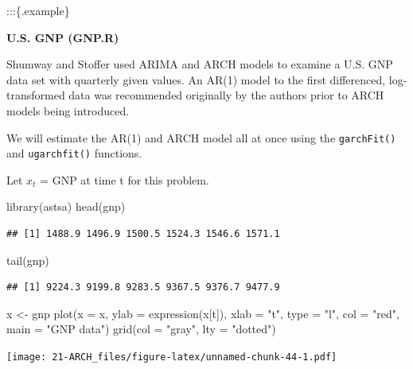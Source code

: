 \documentclass[
]{book}
\newenvironment{Shaded}{\begin{snugshade}}{\end{snugshade}}
\newcommand{\AttributeTok}[1]{\textcolor[rgb]{0.77,0.63,0.00}{#1}}
\newcommand{\FunctionTok}[1]{\textcolor[rgb]{0.00,0.00,0.00}{#1}}
\newcommand{\NormalTok}[1]{#1}
\newcommand{\OtherTok}[1]{\textcolor[rgb]{0.56,0.35,0.01}{#1}}
\newcommand{\StringTok}[1]{\textcolor[rgb]{0.31,0.60,0.02}{#1}}
\theoremstyle{definition}
\theoremstyle{definition}
\theoremstyle{definition}
\theoremstyle{definition}
\theoremstyle{remark}
\begin{document}
:::\{.example\}

\textbf{U.S. GNP (GNP.R)}

Shumway and Stoffer used ARIMA and ARCH models to examine a U.S. GNP data set with quarterly given values. An AR(1) model to the first differenced, log-transformed data was recommended originally by the authors prior to ARCH models being introduced.

We will estimate the AR(1) and ARCH model all at once using the \texttt{garchFit()} and \texttt{ugarchfit()} functions.

Let \(x_t\) = GNP at time t for this problem.

\begin{Shaded}
\begin{Highlighting}[]
\FunctionTok{library}\NormalTok{(astsa)}
\FunctionTok{head}\NormalTok{(gnp)}
\end{Highlighting}
\end{Shaded}

\begin{verbatim}
## [1] 1488.9 1496.9 1500.5 1524.3 1546.6 1571.1
\end{verbatim}

\begin{Shaded}
\begin{Highlighting}[]
\FunctionTok{tail}\NormalTok{(gnp)}
\end{Highlighting}
\end{Shaded}

\begin{verbatim}
## [1] 9224.3 9199.8 9283.5 9367.5 9376.7 9477.9
\end{verbatim}

\begin{Shaded}
\begin{Highlighting}[]
\NormalTok{x }\OtherTok{\textless{}{-}}\NormalTok{ gnp}
\FunctionTok{plot}\NormalTok{(}\AttributeTok{x =}\NormalTok{ x, }\AttributeTok{ylab =} \FunctionTok{expression}\NormalTok{(x[t]), }\AttributeTok{xlab =} \StringTok{"t"}\NormalTok{, }\AttributeTok{type =} 
       \StringTok{"l"}\NormalTok{, }\AttributeTok{col =} \StringTok{"red"}\NormalTok{,  }\AttributeTok{main =} \StringTok{"GNP data"}\NormalTok{)}
\FunctionTok{grid}\NormalTok{(}\AttributeTok{col =} \StringTok{"gray"}\NormalTok{, }\AttributeTok{lty =} \StringTok{"dotted"}\NormalTok{) }
\end{Highlighting}
\end{Shaded}

\texttt{[image: 21-ARCH\_files/figure-latex/unnamed-chunk-44-1.pdf]}
\end{document}
